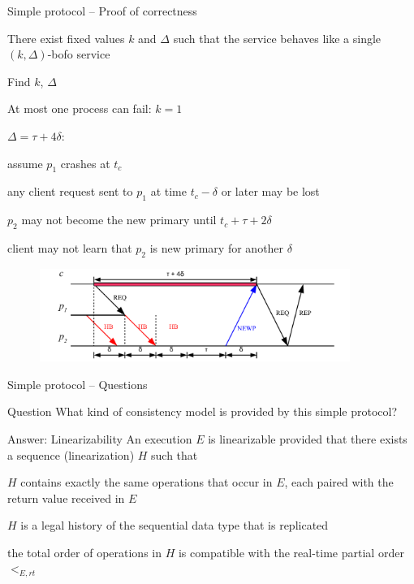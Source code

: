 \begin{frame}{Simple protocol -- Proof of correctness}
	
\BIL
\item[PB3] There exist fixed values $k$ and $\Delta$ such that the service
behaves like a single $(k, \Delta)$-bofo service
\item[Proof] Find $k$, $\Delta$
\BI
\item At most one process can fail: $k=1$
\item $\Delta = \tau + 4\delta$:
\BI
\item assume $p_1$ crashes at $t_c$
\item any client request sent to $p_1$ at time $t_c - \delta$ or later may be lost
\item $p_2$ may not become the new primary until $t_c + \tau + 2\delta$
\item client may not learn that $p_2$ is new primary for another $\delta$
\EI
\EI
\EIL

\begin{figure}
	\includegraphics[width=0.9\textwidth]{pb2}
\end{figure}

\end{frame}

\begin{frame}{Simple protocol -- Questions}

\begin{block}{Question}	
What kind of consistency model is provided by this simple protocol?
\end{block}

\pause
\bigskip
\begin{block}{Answer: Linearizability}
An execution $E$ is linearizable provided that there exists a sequence (\alert{linearization}) $H$ such that
\BE
\item[L1] $H$ contains exactly the same operations that occur in $E$, each paired with the return value received in $E$
\item[L2] $H$ is a legal history of the sequential data type that is replicated
\item[L3] the total order of operations in $H$ is \alert{compatible} with the real-time partial order $<_{E,rt}$
\EE	
\end{block}


\end{frame}


